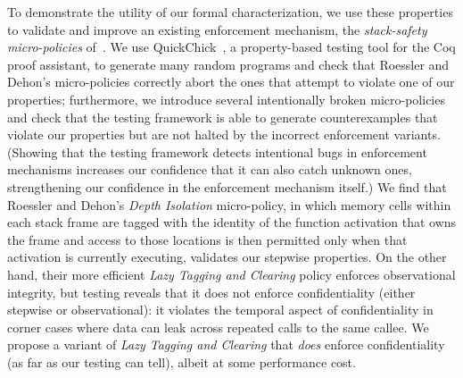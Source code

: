 \documentclass[acmsmall,review,anonymous]{acmart}\settopmatter{printfolios=true,printccs=false,printacmref=false}
\begin{document}
To demonstrate the utility of our formal characterization, we use these
properties to validate and improve an existing enforcement mechanism, the
{\em stack-safety micro-policies} of~\citet{DBLP:conf/sp/RoesslerD18}.  We
use QuickChick~\citep{Denes:VSL2014,Pierce:SF4}, a property-based testing
tool for the Coq proof assistant, to generate many random programs and check
that Roessler and Dehon's micro-policies correctly abort the ones that
attempt to violate one of our properties; furthermore, we introduce several
intentionally broken micro-policies and check that the testing framework is
able to generate counterexamples that violate our properties but are not
halted by the incorrect enforcement variants.  (Showing that the testing
framework detects intentional bugs in enforcement mechanisms increases our
confidence that it can also catch unknown ones, strengthening our confidence
in the enforcement mechanism itself.\ifaftersubmission{}\fi)
%
We find that Roessler and Dehon's {\em Depth Isolation} micro-policy, in
which memory cells within each stack frame are tagged with the identity of
the function activation that owns the frame and access to those locations is
then permitted only when that activation is currently executing, validates our
stepwise properties.  On the other hand, their more efficient \emph{Lazy
  Tagging and Clearing} policy enforces observational integrity, but testing
reveals that it does not enforce confidentiality (either
stepwise or
observational): it violates the temporal aspect of confidentiality in
corner cases where data can leak across repeated calls to the same callee.  We
propose a variant of {\em Lazy Tagging and Clearing} that \emph{does} enforce
confidentiality (as far as our testing can tell), albeit at some performance
cost.
%
\ifaftersubmission
{}
\fi
\end{document}
